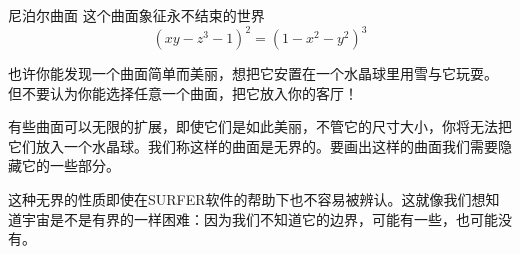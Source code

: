 ﻿\begin{surferPage}{尼泊尔曲面}
这个曲面象征永不结束的世界\\

\smallskip
\[(x y - z^3 -1)^2= (1 - x^2	- y^2)^3\]

\singlespacing

也许你能发现一个曲面简单而美丽，想把它安置在一个水晶球里用雪与它玩耍。 但不要认为你能选择任意一个曲面，把它放入你的客厅！\\

\singlespacing

有些曲面可以无限的扩展，即使它们是如此美丽，不管它的尺寸大小，你将无法把它们放入一个水晶球。我们称这样的曲面是无界的。要画出这样的曲面我们需要隐藏它的一些部分。\\

\singlespacing

这种无界的性质即使在SURFER软件的帮助下也不容易被辨认。这就像我们想知道宇宙是不是有界的一样困难：因为我们不知道它的边界，可能有一些，也可能没有。
\end{surferPage}

